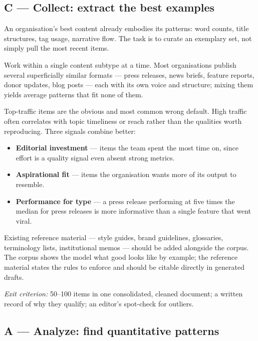 \documentclass[11pt]{article}
\begin{document}
\subsection{C --- Collect: extract the best examples}

An organisation's best content already embodies its patterns: word
counts, title structures, tag usage, narrative flow. The task is to
curate an exemplary set, not simply pull the most recent items.

Work within a single content subtype at a time. Most organisations
publish several superficially similar formats --- press releases,
news briefs, feature reports, donor updates, blog posts --- each with
its own voice and structure; mixing them yields average patterns that
fit none of them.

Top-traffic items are the obvious and most common wrong default.
High traffic often correlates with topic timeliness or reach rather
than the qualities worth reproducing. Three signals combine better:

\begin{itemize}[nosep]
  \item \textbf{Editorial investment} --- items the team spent the
        most time on, since effort is a quality signal even absent
        strong metrics.
  \item \textbf{Aspirational fit} --- items the organisation wants
        more of its output to resemble.
  \item \textbf{Performance for type} --- a press release performing
        at five times the median for press releases is more
        informative than a single feature that went viral.
\end{itemize}

Existing reference material --- style guides, brand guidelines,
glossaries, terminology lists, institutional memos --- should be
added alongside the corpus. The corpus shows the model what good looks
like by example; the reference material states the rules to enforce
and should be citable directly in generated drafts.

\emph{Exit criterion:} 50--100 items in one consolidated, cleaned
document; a written record of why they qualify; an editor's spot-check
for outliers.

\subsection{A --- Analyze: find quantitative patterns}
\end{document}
